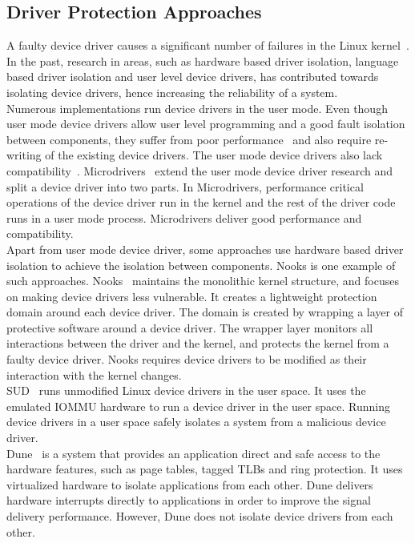 \subsection{Driver Protection Approaches}
A faulty device driver causes a significant number of failures in the Linux kernel~\cite{tanenbaum2006can, coveritykernel}. In the past, research in areas, such as hardware based driver isolation, language based driver isolation and user level device drivers, has contributed towards isolating device drivers, hence increasing the reliability of a system.
\\[3mm]
Numerous implementations run device drivers in the user mode. Even though user mode device drivers allow user level programming and a good fault isolation between components, they suffer from poor performance~\cite{armand1991give} and also require re-writing of the existing device drivers. The user mode device drivers also lack compatibility~\cite{Leslie+:jcst2005}. Microdrivers~\cite{Ganapathy:2008:DIM:1346281.1346303} extend the user mode device driver research and split a device driver into two parts. In Microdrivers, performance critical operations of the device driver run in the kernel and the rest of the driver code runs in a user mode process. Microdrivers deliver good performance and compatibility.
\\[3mm]
Apart from user mode device driver, some approaches use hardware based driver isolation to achieve the isolation between components. Nooks is one example of such approaches. Nooks~\cite{swift2005improving} maintains the monolithic kernel structure, and focuses on making device drivers less vulnerable. It creates a lightweight protection domain around each device driver. The domain is created by wrapping a layer of protective software around a device driver. The wrapper layer monitors all interactions between the driver and the kernel, and protects the kernel from a faulty device driver. Nooks requires device drivers to be modified as their interaction with the kernel changes. 
\\[3mm]
SUD~\cite{Boyd-Wickizer+:atc2010} runs unmodified Linux device drivers in the user space. It uses the emulated IOMMU hardware to run a device driver in the user space. Running device drivers in a user space safely isolates a system from a malicious device driver. 
\\[3mm]
Dune~\cite{Belay+:osdi12} is a system that provides an application direct and safe access to the hardware features, such as page tables, tagged TLBs and ring protection. It uses virtualized hardware to isolate applications from each other. Dune delivers hardware interrupts directly to applications in order to improve the signal delivery performance. However, Dune does not isolate device drivers from each other.

